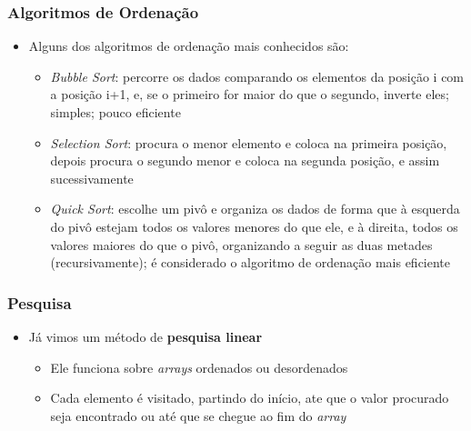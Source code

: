 \documentclass[xcolor={dvipsnames,table},aspectratio=169]{beamer}
\begin{document}
\begin{frame}\frametitle{Algoritmos de Ordenação}
\begin{itemize}
	\item Alguns dos algoritmos de ordenação mais conhecidos são:
	\begin{itemize}
		\item \emph{Bubble Sort}: percorre os dados comparando os elementos da posição i com a posição i+1, e, se o primeiro for maior do que o segundo, inverte eles; simples; pouco eficiente
		\item \emph{Selection Sort}: procura o menor elemento e coloca na primeira posição, depois procura o segundo menor e coloca na segunda posição, e assim sucessivamente
		\item \emph{Quick Sort}: escolhe um pivô e organiza os dados de forma que à esquerda do pivô estejam todos os valores menores do que ele, e à direita, todos os valores maiores do que o pivô, organizando a seguir as duas metades (recursivamente); é considerado o algoritmo de ordenação mais eficiente
	\end{itemize}
\end{itemize}
\end{frame}

\begin{frame}\frametitle{Pesquisa}
\begin{itemize}
	\item Já vimos um método de \textbf{pesquisa linear}
	\begin{itemize}
		\item Ele funciona sobre \emph{arrays} ordenados ou desordenados
		\item Cada elemento é visitado, partindo do início, ate que o valor procurado seja encontrado ou até que se chegue ao fim do \emph{array}
	\end{itemize}
\end{itemize}
\end{frame}
\end{document}
